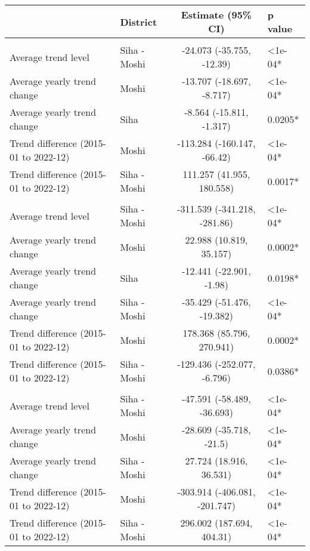 \begingroup
\fontsize{12.0pt}{14.4pt}\selectfont
\begin{longtable}{l|lcl}
\toprule
 & District & Estimate (95\% CI) & p value \\ 
\midrule\addlinespace[2.5pt]
\multicolumn{4}{l}{Chronic Respiratory Disease} \\[2.5pt] 
\midrule\addlinespace[2.5pt]
Average trend level & Siha - Moshi & -24.073 (-35.755, -12.39) & <1e-04* \\ 
Average yearly trend change & Moshi & -13.707 (-18.697, -8.717) & <1e-04* \\ 
Average yearly trend change & Siha & -8.564 (-15.811, -1.317) & 0.0205* \\ 
Trend difference (2015-01 to 2022-12) & Moshi & -113.284 (-160.147, -66.42) & <1e-04* \\ 
Trend difference (2015-01 to 2022-12) & Siha - Moshi & 111.257 (41.955, 180.558) & 0.0017* \\ 
\midrule\addlinespace[2.5pt]
\multicolumn{4}{l}{Diabetes Mellitus} \\[2.5pt] 
\midrule\addlinespace[2.5pt]
Average trend level & Siha - Moshi & -311.539 (-341.218, -281.86) & <1e-04* \\ 
Average yearly trend change & Moshi & 22.988 (10.819, 35.157) & 0.0002* \\ 
Average yearly trend change & Siha & -12.441 (-22.901, -1.98) & 0.0198* \\ 
Average yearly trend change & Siha - Moshi & -35.429 (-51.476, -19.382) & <1e-04* \\ 
Trend difference (2015-01 to 2022-12) & Moshi & 178.368 (85.796, 270.941) & 0.0002* \\ 
Trend difference (2015-01 to 2022-12) & Siha - Moshi & -129.436 (-252.077, -6.796) & 0.0386* \\ 
\midrule\addlinespace[2.5pt]
\multicolumn{4}{l}{Epilepsy} \\[2.5pt] 
\midrule\addlinespace[2.5pt]
Average trend level & Siha - Moshi & -47.591 (-58.489, -36.693) & <1e-04* \\ 
Average yearly trend change & Moshi & -28.609 (-35.718, -21.5) & <1e-04* \\ 
Average yearly trend change & Siha - Moshi & 27.724 (18.916, 36.531) & <1e-04* \\ 
Trend difference (2015-01 to 2022-12) & Moshi & -303.914 (-406.081, -201.747) & <1e-04* \\ 
Trend difference (2015-01 to 2022-12) & Siha - Moshi & 296.002 (187.694, 404.31) & <1e-04* \\ 

\end{longtable}
